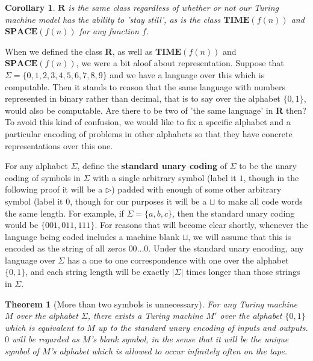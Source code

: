\documentclass{article}
\theoremstyle{definition}
\theoremstyle{plain}
\theoremstyle{theorem}
\newtheorem{theorem}{Theorem}[section]
\newtheorem{corollary}{Corollary}[section]
\begin{document}
\begin{corollary}
	$\bm{R}$ is the same class regardless of whether or not our Turing machine model has the ability to 'stay still', as is the class $\bm{TIME}(f(n))$ and $\bm{SPACE}(f(n))$ for any function $f$. 
\end{corollary}
When we defined the class \textbf{R}, as well as $\bm{TIME}(f(n))$ and $\bm{SPACE}(f(n))$, we were a bit aloof about representation. Suppose that $\Sigma = \{0,1,2,3,4,5,6,7,8,9\}$ and we have a language over this which is computable. Then it stands to reason that the same language with numbers represented in binary rather than decimal, that is to say over the alphabet $\{0,1\}$, would also be computable. Are there to be two of 'the same language' in \textbf{R} then? To avoid this kind of confusion, we would like to fix a specific alphabet and a particular encoding of problems in other alphabets so that they have concrete representations over this one. \par 
For any alphabet $\Sigma$, define the \textbf{standard unary coding} of $\Sigma$ to be the unary coding of symbols in $\Sigma$ with a single arbitrary symbol (label it $1$, though in the following proof it will be a $\triangleright$) padded with enough of some other arbitrary symbol (label it $0$, though for our purposes it will be a $\sqcup$ to make all code words the same length. For example, if $\Sigma = \{a,b,c\}$, then the standard unary coding would be $\{001,011,111\}$. For reasons that will become clear shortly, whenever the language being coded includes a machine blank $\sqcup$, we will assume that this is encoded as the string of all zeros $00\ldots 0$. Under the standard unary encoding, any language over $\Sigma$ has a one to one correspondence with one over the alphabet $\{0,1\}$, and each string length will be exactly $|\Sigma|$ times longer than those strings in $\Sigma$. 
\begin{theorem}[More than two symbols is unnecessary]
	For any Turing machine $M$ over the alphabet $\Sigma$, there exists a Turing machine $M'$ over the alphabet $\{0,1\}$ which is equivalent to $M$ \textit{up to} the standard unary encoding of inputs and outputs. $0$ will be regarded as $M$'s blank symbol, in the sense that it will be the unique symbol of $M$'s alphabet which is allowed to occur infinitely often on the tape. 
\end{theorem}
\end{document}
